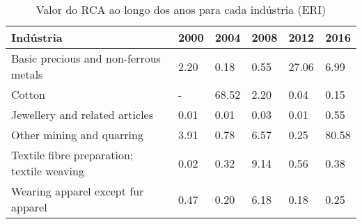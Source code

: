 \begin{table}
\centering
\caption{Valor do RCA ao longo dos anos para cada indústria (ERI)}
\begin{tabular}{p{6cm}p{1.5cm}p{1.5cm}p{1.5cm}p{1.5cm}p{1.5cm}}
\toprule
                                 Indústria & 2000 &  2004 & 2008 &  2012 &  2016 \\
\midrule
     Basic precious and non-ferrous metals & 2.20 &  0.18 & 0.55 & 27.06 &  6.99 \\
                                    Cotton &    - & 68.52 & 2.20 &  0.04 &  0.15 \\
            Jewellery and related articles & 0.01 &  0.01 & 0.03 &  0.01 &  0.55 \\
                 Other mining and quarring & 3.91 &  0.78 & 6.57 &  0.25 & 80.58 \\
Textile fibre preparation; textile weaving & 0.02 &  0.32 & 9.14 &  0.56 &  0.38 \\
        Wearing apparel except fur apparel & 0.47 &  0.20 & 6.18 &  0.18 &  0.25 \\
\bottomrule
\end{tabular}
\end{table}
